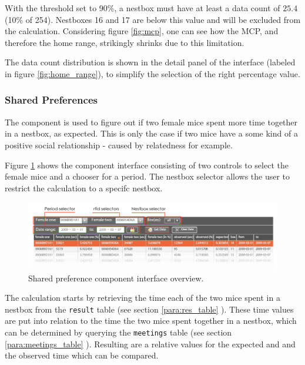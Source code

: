 With the threshold set to 90\%, a nestbox must have at least a data count of $25.4$ (10\% of 254). Nestboxes 16 and 17 are below this value and will be excluded from the calculation. Considering figure \ref{fig:mcp}, one can see how the MCP, and therefore the home range, strikingly shrinks due to this limitation. 

The data count distribution is shown in the detail panel of the interface (labeled in figure \ref{fig:home_range}), to simplify the selection of the right percentage value.     

\subsubsection{Shared Preferences}
\label{subsubsec:sharedpref}

The component is used to figure out if two female mice spent more time together in a nestbox, as expected. This is only the case if two mice have a some kind of a positive social relationship - caused by relatedness for example.

Figure \ref{fig:shared_pref} shows the component interface consisting of two controls to select the female mice and a chooser for a period. The nestbox selector allows the user to restrict the calculation to a specifc nestbox.

\begin{figure}[htpb]
\begin{center}
  \includegraphics[width=\textwidth]{assets/pdf/shared_pref.pdf}
  \caption[Shared preference component interface]{Shared preference component interface overview.}
  \label{fig:shared_pref}
\end{center}
\end{figure}

The calculation starts by retrieving the time each of the two mice spent in a nestbox from the \lstinline|result| table (see section \ref{para:res_table} \pageref{para:res_table}). These time values are put into relation to the time the two mice spent together in a nestbox, which can be determined by querying the \lstinline|meetings| table (see section \ref{para:meetings_table} \pageref{para:meetings_table}). Resulting are a relative values for the expected and and the observed time which can be compared. 

